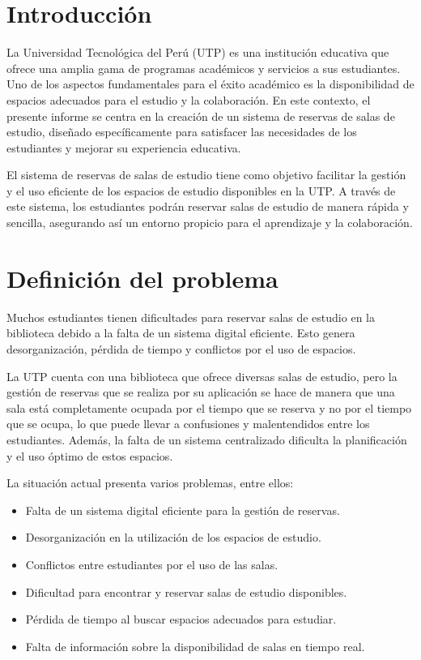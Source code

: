 \documentclass{article}
\begin{document}
\section{Introducción}
La Universidad Tecnológica del Perú (UTP) es una institución educativa que ofrece una amplia gama de programas académicos y servicios a sus estudiantes. Uno de los aspectos fundamentales para el éxito académico es la disponibilidad de espacios adecuados para el estudio y la colaboración. En este contexto, el presente informe se centra en la creación de un sistema de reservas de salas de estudio, diseñado específicamente para satisfacer las necesidades de los estudiantes y mejorar su experiencia educativa.

El sistema de reservas de salas de estudio tiene como objetivo facilitar la gestión y el uso eficiente de los espacios de estudio disponibles en la UTP. A través de este sistema, los estudiantes podrán reservar salas de estudio de manera rápida y sencilla, asegurando así un entorno propicio para el aprendizaje y la colaboración.
\vspace*{\fill}

\newpage

\section{Definición del problema}

Muchos estudiantes tienen dificultades para reservar salas de estudio en la biblioteca 
debido a la falta de un sistema digital eficiente. Esto genera desorganización, pérdida de tiempo y conflictos por el uso de espacios.

La UTP cuenta con una biblioteca que ofrece diversas salas de estudio, pero la gestión de reservas que se realiza por su aplicación se hace de manera que una sala está completamente ocupada por el tiempo que se reserva y no por el tiempo que se ocupa, lo que puede llevar a confusiones y malentendidos entre los estudiantes. Además, la falta de un sistema centralizado dificulta la planificación y el uso óptimo de estos espacios.

La situación actual presenta varios problemas, entre ellos:
\begin{itemize}
    \item Falta de un sistema digital eficiente para la gestión de reservas.
    \item Desorganización en la utilización de los espacios de estudio.
    \item Conflictos entre estudiantes por el uso de las salas.
    \item Dificultad para encontrar y reservar salas de estudio disponibles.
    \item Pérdida de tiempo al buscar espacios adecuados para estudiar.
    \item Falta de información sobre la disponibilidad de salas en tiempo real.
\end{itemize}
\end{document}
